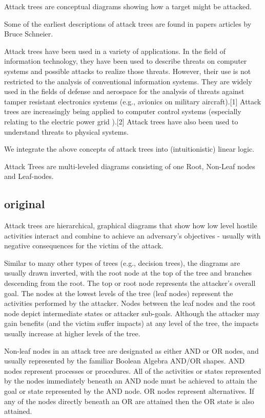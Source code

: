 Attack trees are conceptual diagrams showing how a target might be attacked. 


Some of the earliest descriptions of attack trees are found in papers articles by Bruce Schneier. 



Attack trees have been used in a variety of applications. In the field of information technology, they have been used to describe threats on computer systems and possible attacks to realize those threats. However, their use is not restricted to the analysis of conventional information systems. They are widely used in the fields of defense and aerospace for the analysis of threats against tamper resistant electronics systems (e.g., avionics on military aircraft).[1] Attack trees are increasingly being applied to computer control systems (especially relating to the electric power grid ).[2] Attack trees have also been used to understand threats to physical systems.

We integrate the above concepts of attack trees into (intuitionistic) linear logic.  

Attack Trees are multi-leveled diagrams consisting of one Root, Non-Leaf nodes and Leaf-nodes.

\subsection{original}

Attack trees are hierarchical, graphical diagrams that show how low level hostile activities interact and combine to achieve an adversary's objectives - usually with negative consequences for the victim of the attack.

Similar to many other types of trees (e.g., decision trees), the diagrams are usually drawn inverted, with the root node at the top of the tree and branches descending from the root. The top or root node represents the attacker's overall goal. The nodes at the lowest levels of the tree (leaf nodes) represent the activities performed by the attacker. Nodes between the leaf nodes and the root node depict intermediate states or attacker sub-goals. Although the attacker may gain benefits (and the victim suffer impacts) at any level of the tree, the impacts usually increase at higher levels of the tree.

Non-leaf nodes in an attack tree are designated as either AND or OR nodes, and usually represented by the familiar Boolean Algebra AND/OR shapes. 
AND nodes represent processes or procedures. All of the activities or states represented by the nodes immediately beneath an AND node must be achieved to attain the goal or state represented by the AND node. 
OR nodes represent alternatives. If any of the nodes directly beneath an OR are attained then the OR state is also attained.

